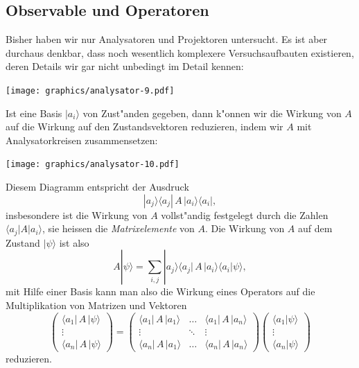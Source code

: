 \subsection{Observable und Operatoren}
Bisher haben wir nur Analysatoren und Projektoren untersucht.
Es ist aber durchaus denkbar, dass noch wesentlich komplexere
Versuchsaufbauten existieren, deren Details wir gar nicht unbedingt
im Detail kennen:
\begin{center}
\texttt{[image: graphics/analysator-9.pdf]}
\end{center}
Ist eine Basis $|a_i\rangle$ von Zust"anden gegeben, dann k"onnen
wir die Wirkung von $A$ auf die Wirkung auf den Zustandsvektoren
reduzieren, indem wir $A$ mit Analysatorkreisen zusammensetzen:
\begin{center}
\texttt{[image: graphics/analysator-10.pdf]}
\end{center}
Diesem Diagramm entspricht der Ausdruck
\[
|a_j\rangle \langle a_j|\, A \,|a_i\rangle \langle a_i|,
\]
insbesondere ist die Wirkung von $A$ vollst"andig festgelegt durch die
Zahlen
$\langle a_j|A|a_i\rangle$, sie heissen die {\em Matrixelemente} von $A$.
Die Wirkung von $A$ auf dem Zustand $|\psi\rangle$ ist also
\begin{equation}
A|\psi\rangle = \sum_{i,j} |a_j\rangle
	\langle a_j|\,A\,|a_i\rangle
	\langle a_i|\psi\rangle,
\label{skript:A-wirkung}
\end{equation}
mit Hilfe einer Basis kann man also die Wirkung eines Operators auf
die Multiplikation von Matrizen und Vektoren
\[
\begin{pmatrix}
\langle a_1|\,A\,|\psi\rangle\\
\vdots\\
\langle a_n|\,A\,|\psi\rangle
\end{pmatrix}
=
\begin{pmatrix}
\langle a_1|\,A\,|a_1\rangle&\dots &\langle a_1|\,A\,|a_n\rangle\\
\vdots                  &\ddots&\vdots                  \\
\langle a_n|\,A\,|a_1\rangle&\dots &\langle a_n|\,A\,|a_n\rangle
\end{pmatrix}
\begin{pmatrix}
\langle a_1|\psi\rangle\\
\vdots\\
\langle a_n|\psi\rangle
\end{pmatrix}
\]
reduzieren.

